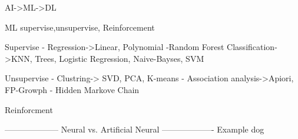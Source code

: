 AI->ML->DL

ML supervise,unsupervise, Reinforcement

Supervise
- Regression->Linear, Polynomial
-Random Forest
Classification->KNN, Trees, Logistic Regression, Naive-Bayses, SVM

Unsupervise
- Clustring-> SVD, PCA, K-means
- Association analysis->Apiori, FP-Growph
- Hidden Markove Chain

Reinforcment


--------------------
Neural vs. Artificial Neural
-------------------
Example dog
